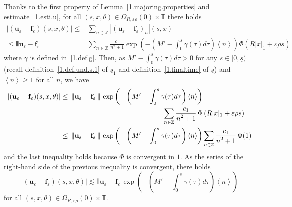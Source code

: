 \documentclass[10pt]{amsart}
\theoremstyle{definition}
\theoremstyle{plain}
\newcommand*\e{\varepsilon}
\newcommand*\Z{{\mathbb Z}}
\newcommand*\g{\gamma}
\newcommand{\ubf}{{\mathbf u}}
\newcommand*\f{{\mathbf f}}
\newcommand*\dsp{\displaystyle}
\newcommand*\und{\underline}
\DeclarePairedDelimiter{\VERT}{|\mkern -1.6mu|\mkern -1.6mu|}{|\mkern -1.6mu|\mkern -1.6mu|}
\begin{document}
Thanks to the first property of Lemma~\ref{1.majoring.properties} and estimate~\eqref{1.esti.u}, for all $(s,x,\theta)\in\Omega_{R,\e\rho}(0)\times\mathbb{T}$ there holds
\begin{align*}
|(\ubf_{\e}-\f_{\e})(s,x,\theta)| \leq &\sum_{n\in\Z} |(\ubf_{\e}-\f_{\e})_n|(s,x) \\
\leq \dsp \VERT{\ubf_{\e}-\f_{\e}} &\sum_{n\in\Z} \frac{\dsp c_1}{\dsp n^2+1} \exp\left(-\left(M'- \int_{0}^{s} \g(\tau) d\tau \right) \left<n\right> \right) \Phi\left(R|x|_1 + \e\rho s\right)
\end{align*}
where $\g$ is defined in~\eqref{1.def.g}. Then, as $M'- \int_{0}^{s} \g(\tau) d\tau >0$ for any $s\in[0,\und{s})$ (recall definition~\eqref{1.def.und.s.1} of $\und{s}_1$ and definition~\eqref{1.finaltime} of $\und{s}$) and $\left<n\right> \geq 1$ for all $n$, we have
\begin{align*}
|(\ubf_{\e}-\f_{\e})(s,x,\theta)| & \leq \dsp \VERT{\ubf_{\e} - \f_{\e}}\,\exp\left(-\left(M'- \int_{0}^{s} \g(\tau) d\tau \right) \left<n\right> \right)\\
& \mkern263mu \sum_{n\in\Z} \frac{\dsp c_1}{\dsp n^2+1} \,\Phi\left(R|x|_1 + \e\rho s\right) \\
& \leq \dsp \VERT{\ubf_{\e} - \f_{\e}}\,\exp\left(-\left(M'- \int_{0}^{s} \g(\tau) d\tau \right) \left<n\right> \right) \sum_{n\in\Z} \frac{\dsp c_1}{\dsp n^2+1} \,\Phi(1)
\end{align*}
and the last inequality holds because $\Phi$ is convergent in $1$. As the series of the right-hand side of the previous inequality is convergent, there holds
\[
|(\ubf_{\e}-\f_{\e})(s,x,\theta)| \lesssim \dsp \VERT{\ubf_{\e} - \f_{\e}}\,\exp\left(-\left(M'- \int_{0}^{s} \g(\tau) d\tau \right) \left<n\right> \right)
\]
for all $(s,x,\theta)\in\Omega_{R,\e\rho}(0)\times\mathbb{T}$.
\end{document}
